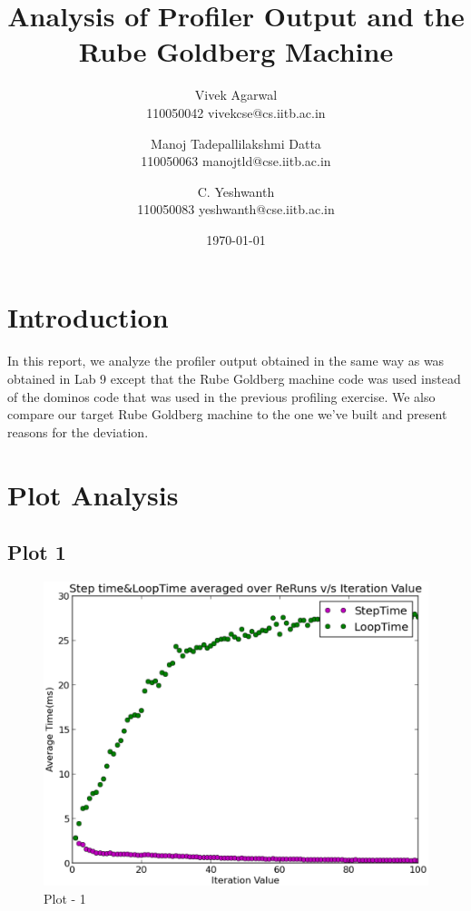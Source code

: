 \documentclass[11pt] {article}
\begin{document}
\title {Analysis of Profiler Output and the Rube Goldberg Machine}
\author 	{	Vivek Agarwal \\
				110050042 vivekcse@cs.iitb.ac.in \\
				\and
				Manoj Tadepallilakshmi Datta \\
			 	110050063 manojtld@cse.iitb.ac.in \\
			 	\and
			 	C. Yeshwanth \\
			 	110050083 yeshwanth@cse.iitb.ac.in}
\date{\today}
\maketitle

\section {Introduction}

In this report, we analyze the profiler output obtained in the same way as was obtained in Lab 9 except that the 
Rube Goldberg machine code was used instead of the dominos code that was used in the previous profiling exercise.
We also compare our target Rube Goldberg machine to the one we've built and present reasons for the deviation.

\section{Plot Analysis}

\subsection{Plot 1}

\begin {figure} [ht]
\begin {center}
\includegraphics[scale = 0.35] {1.eps}
\end {center}
\caption {Plot - 1}
\end {figure}
\end{document}
